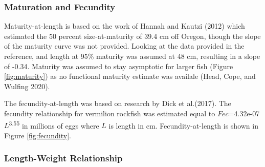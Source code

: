 \documentclass[11pt,
  english,
  a4paper,
]{article}
\begin{document}
\leavevmode\tagmcend\tagstructend\par


\hypertarget{maturation-and-fecundity}{%
\subsubsection{Maturation and Fecundity}\label{maturation-and-fecundity}}

\leavevmode\tagmcend\tagstructend


Maturity-at-length is based on the work of Hannah and Kautzi {(2012)\leavevmode\tagmcend\tagstructend} which estimated the 50 percent size-at-maturity of 39.4 cm off Oregon, though the slope of the maturity curve was not provided. Looking at the data provided in the reference, and length at 95\% maturity was assumed at 48 cm, resulting in a slope of -0.34. Maturity was assumed to stay asymptotic for larger fish (Figure \ref{fig:maturity}) as no functional maturity estimate was availale {(Head, Cope, and Wulfing 2020)\leavevmode\tagmcend\tagstructend}.

\leavevmode\tagmcend\tagstructend\par


The fecundity-at-length was based on research by Dick et al.{(2017)\leavevmode\tagmcend\tagstructend}. The fecundity relationship for vermilion rockfish was estimated equal to {\(Fec\)\leavevmode\tagmcend\tagstructend}=4.32e-07{\(L\)\leavevmode\tagmcend\tagstructend}\textsuperscript{3.55} in millions of eggs where {\(L\)\leavevmode\tagmcend\tagstructend} is length in cm. Fecundity-at-length is shown in Figure \ref{fig:fecundity}.

\leavevmode\tagmcend\tagstructend\par


\hypertarget{length-weight-relationship}{%
\subsubsection{Length-Weight Relationship}\label{length-weight-relationship}}
\end{document}
